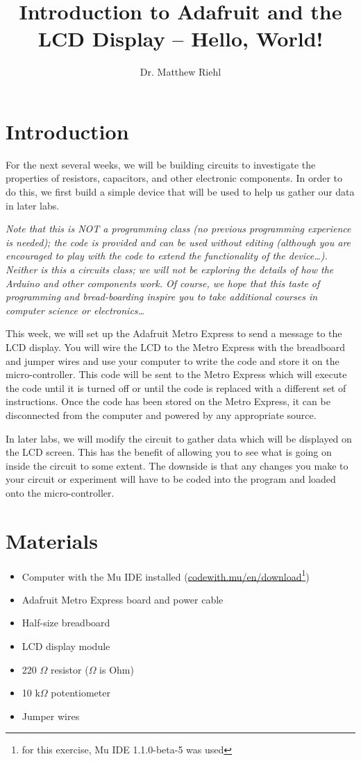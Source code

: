 \documentclass[]{article}
\title{Introduction to Adafruit and the LCD Display  --  Hello, World!}
\author{Dr. Matthew Riehl}
\begin{document}
\newcommand{\tc}{\textcolor}

\maketitle

\section{Introduction}

For the next several weeks, we will be building circuits to investigate the properties of resistors, capacitors,  and other electronic components.  In order to do this, we  first build a simple device that will be used to help us gather our data in later labs.

\emph{Note that this is NOT a programming class (no previous programming experience is needed); the code is provided and can be used without editing (although you are encouraged to play with the code to extend the functionality of the device\dots). Neither is this a circuits class; we will not be exploring the details of how the Arduino and other components work.  Of course, we hope that this taste of programming and bread-boarding inspire you to take additional courses in computer science or electronics\dots}

This week, we will set up the Adafruit Metro Express to send a  message to the LCD display.  You will wire the LCD to the Metro Express with the breadboard and jumper wires and use your computer to write the code and store it on the micro-controller. This code will be sent to the Metro Express which will execute the code until it is turned off or until the code is replaced with a different set of instructions.  Once the code has been stored on the Metro Express, it can be disconnected from the computer and powered by any appropriate source.

In later labs, we will modify the circuit to gather data which will be displayed on the LCD screen.  This has the benefit of allowing you to see what is going on inside the circuit to some extent.  The downside is that any changes you make to your circuit or experiment will have to be coded into the program and loaded onto the micro-controller.  

\section{Materials}

\begin{itemize}
	\item Computer with the Mu IDE installed (\href{https://codewith.mu/en/download}{codewith.mu/en/download}\footnote{for this exercise, Mu IDE 1.1.0-beta-5 was used})
	\item Adafruit Metro Express board and power cable
	\item Half-size breadboard
	\item LCD display module
	\item 220 $\Omega$ resistor ($\Omega$ is Ohm)
	\item 10 k$\Omega$ potentiometer
	\item Jumper wires
\end{itemize}
\end{document}
